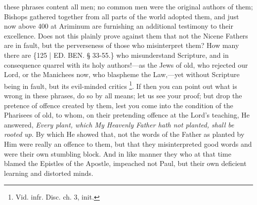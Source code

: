 these phrases content all men; no common men were the original authors
of them; Bishops gathered together from all parts of the world adopted
them, and just now above 400 at Ariminum are furnishing an additional
testimony to their excellence. Does not this plainly prove against
them that not the Nicene Fathers are in fault, but the perverseness of
those who misinterpret them? How many there are \{125 | ED.
BEN.
§ 33-55.\} who misunderstand Scripture, and in consequence quarrel
with its holy authors!—as the Jews of old, who rejected our Lord, or
the Manichees now, who blaspheme the Law,—yet without Scripture
being in fault, but its evil-minded critics \footnote{Vid. infr. Disc. ch. 3, init.}. If then you can point out what is wrong in these phrases, do
so by all means; let us see your proof; but drop the pretence of
offence created by them, lest you come into the condition of the
Pharisees of old, to whom, on their pretending offence at the Lord's
teaching, He answered, \emph{Every plant, which My Heavenly Father hath
not planted, shall be rooted up}. By which He showed that, not the
words of the Father as planted by Him were really an offence to them,
but that they misinterpreted good words and were their own stumbling
block. And in like manner they who at that time blamed the Epistles of
the Apostle, impeached not Paul, but their own deficient learning and
distorted minds.

